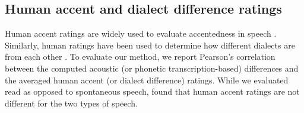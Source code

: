 \documentclass[11pt,a4paper]{article}
\begin{document}



\subsection{Human accent and dialect difference ratings}
Human accent ratings are widely used to evaluate accentedness in speech \citep{koster1993evaluation, munro1995nonsegmental, magen1998perception, munro2001modeling}. Similarly, human ratings have been used to determine how different dialects are from each other \citep{gooskens2004perceptive}. 
To evaluate our method, we report Pearson's correlation between the computed acoustic (or phonetic transcription-based) differences and the averaged human accent (or dialect difference) ratings. 
While we evaluated read as opposed to spontaneous speech, \citet{munro1994evaluations} found that human accent ratings are not different for the two types of speech.
\end{document}
